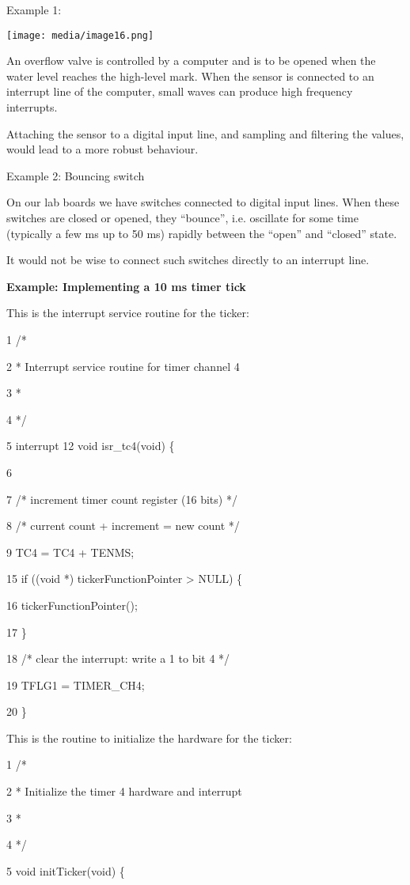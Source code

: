 Example 1:

\texttt{[image: media/image16.png]}

An overflow valve is controlled by a computer and is to be opened when
the water level reaches the high-level mark. When the sensor is
connected to an interrupt line of the computer, small waves can produce
high frequency interrupts.

Attaching the sensor to a digital input line, and sampling and filtering
the values, would lead to a more robust behaviour.

Example 2: Bouncing switch

On our lab boards we have switches connected to digital input lines.
When these switches are closed or opened, they ``bounce'', i.e.
oscillate for some time (typically a few ms up to 50 ms) rapidly between
the ``open'' and ``closed'' state.

It would not be wise to connect such switches directly to an interrupt
line.

\textbf{Example: Implementing a 10 ms timer tick}

This is the interrupt service routine for the ticker:

1 /*

2 * Interrupt service routine for timer channel 4

3 *

4 */

5 interrupt 12 void isr\_tc4(void) \{

6

7 /* increment timer count register (16 bits) */

8 /* current count + increment = new count */

9 TC4 = TC4 + TENMS;

15 if ((void *) tickerFunctionPointer \textgreater{} NULL) \{

16 tickerFunctionPointer();

17 \}

18 /* clear the interrupt: write a 1 to bit 4 */

19 TFLG1 = TIMER\_CH4;

20 \}

This is the routine to initialize the hardware for the ticker:

1 /*

2 * Initialize the timer 4 hardware and interrupt

3 *

4 */

5 void initTicker(void) \{

